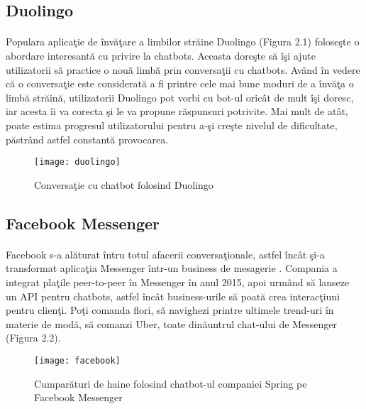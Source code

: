 \subsection{Duolingo}

\paragraph{}
Populara aplica\c tie de \^ inv\u a\c tare a limbilor str\u aine Duolingo \cite{duolingo} (Figura 2.1) folose\c ste o abordare interesant\u a cu privire la chatbots. Aceasta dore\c ste s\u a \^ i\c si ajute utilizatorii s\u a practice o nou\u a limb\u a prin conversa\c tii cu chatbots. Av\^ and \^ in vedere c\u a o conversa\c tie este considerat\u a a fi printre cele mai bune moduri de a \^ inv\u a\c ta o limb\u a str\u ain\u a, utilizatorii Duolingo pot vorbi cu bot-ul oric\^ at de mult \^ i\c si doresc, iar acesta \^ ii va corecta \c si le va propune r\u aspunsuri potrivite. Mai mult de at\^ at, poate estima progresul utilizatorului pentru a-\c si cre\c ste nivelul de dificultate, p\u astr\^ and astfel constant\u a provocarea.

\begin{figure}[H]
\centering
\texttt{[image: duolingo]}
\caption{Conversa\c tie cu chatbot folosind Duolingo}
\end{figure}

\subsection{Facebook Messenger}

\paragraph{}
Facebook s-a al\u aturat \^ intru totul afacerii conversa\c tionale, astfel \^ inc\^ at \c si-a transformat aplica\c tia Messenger \^ intr-un business de mesagerie \cite{facebook-messenger}. Compania a integrat pla\c tile peer-to-peer \^ in Messenger \^ in anul 2015, apoi urm\^ and s\u a lanseze un API pentru chatbots, astfel \^ inc\^ at business-urile s\u a poat\u a crea interac\c tiuni pentru clien\c ti. Po\c ti comanda flori, s\u a navighezi printre ultimele trend-uri \^ in materie de mod\u a, s\u a comanzi Uber, toate din\u auntrul chat-ului de Messenger (Figura 2.2).

\begin{figure}[H]
\centering
\texttt{[image: facebook]}
\caption{Cumpar\u aturi de haine folosind chatbot-ul companiei Spring pe Facebook Messenger}
\end{figure}


